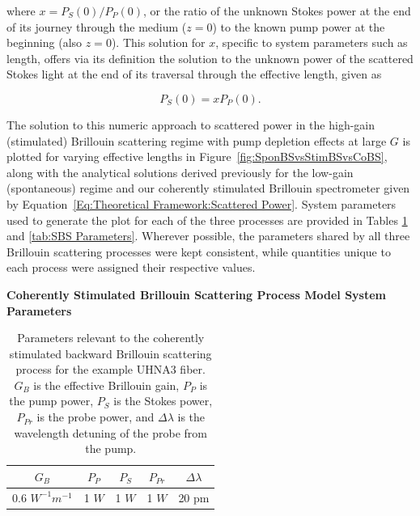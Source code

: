 where $x = P_S(0)/P_P(0)$, or the ratio of the unknown Stokes power at the end of its journey through the medium ($z=0$) to the known pump power at the beginning (also $z=0$). This solution for $x$, specific to system parameters such as length, offers via its definition the solution to the unknown power of the scattered Stokes light at the end of its traversal through the effective length, given as

\begin{equation}
  P_S(0) = xP_{P}(0).
\end{equation}

The solution to this numeric approach to scattered power in the high-gain (stimulated) Brillouin scattering regime with pump depletion effects at large $G$ is plotted for varying effective lengths in Figure~\ref{fig:SponBSvsStimBSvsCoBS}, along with the analytical solutions derived previously for the low-gain (spontaneous) regime and our coherently stimulated Brillouin spectrometer given by Equation~\ref{Eq:Theoretical Framework:Scattered Power}. System parameters used to generate the plot for each of the three processes are provided in Tables \ref{tab:CoBS Parameters} and \ref{tab:SBS Parameters}. Wherever possible, the parameters shared by all three Brillouin scattering processes were kept consistent, while quantities unique to each process were assigned their respective values.

\begin{table}[ht]
  \centering
  \textbf{Coherently Stimulated Brillouin Scattering Process Model System Parameters}
  \renewcommand{\arraystretch}{1.2}
  \begin{tabular}{|c|c|c|c|c|}
    \hline
    $G_{B}$ & $P_{P}$ & $P_{S}$ & $P_{Pr}$ & $\Delta\lambda$ \\
    \hline
    0.6 $W^{-1} m^{-1}$ & 1 $W$ & 1 $W$ & 1 $W$ & 20 pm \\
    \hline
  \end{tabular}
  \caption{Parameters relevant to the coherently stimulated backward Brillouin scattering process for the example UHNA3 fiber. $G_{B}$ is the effective Brillouin gain, $P_{P}$ is the pump power, $P_{S}$ is the Stokes power, $P_{Pr}$ is the probe power, and $\Delta\lambda$ is the wavelength detuning of the probe from the pump.}
  \label{tab:CoBS Parameters}
\end{table}


